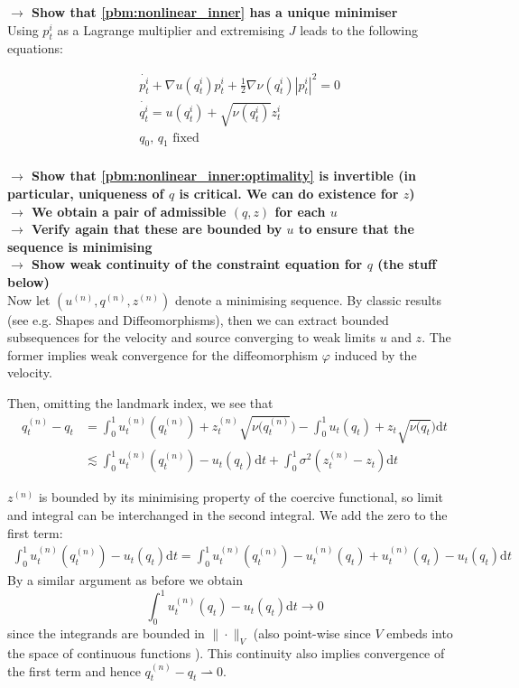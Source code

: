 \documentclass{article}
\newcommand{\half}{\frac 12}
\newcommand{\norm}[2]{\| #1 \|_{ #2 }}
\newcommand{\vnorm}[1]{\norm{ #1 }{V}}
\newcommand{\diff}[1]{\text{d} #1}
\begin{document}
\textbf{$\longrightarrow$ Show that \eqref{pbm:nonlinear_inner} has a unique minimiser}\\

Using $p_t^i$ as a Lagrange multiplier and extremising $J$ leads to the
following equations:

\begin{subequations}\label{pbm:nonlinear_inner:optimality}
\begin{align}
& \dot{p_t^i} + \nabla u(q_t^i) p_t^i + \half \nabla \nu(q_t^i) |p_t^i|^2 = 0\\
& \dot{q_t^i} = u(q_t^i) + \sqrt{\nu(q_t^i)} z^i_t\\
& q_0,\,q_1\text{ fixed}\\
\end{align}
\end{subequations}

\textbf{$\longrightarrow$ Show that \eqref{pbm:nonlinear_inner:optimality} is
invertible (in particular, uniqueness of $q$ is critical. We can do existence
for $z$)}\\
\textbf{$\longrightarrow$ We obtain a pair of admissible $(q,z)$ for each $u$}\\
\textbf{$\longrightarrow$ Verify again that these are bounded by $u$ to ensure
that the sequence is minimising}\\
\textbf{$\longrightarrow$ Show weak continuity of the constraint equation for
$q$ (the stuff below)}\\

Now let $(u^{(n)}, q^{(n)}, z^{(n)})$ denote a
minimising sequence. By classic results (see e.g.  Shapes and Diffeomorphisms),
then we can extract bounded subsequences for the velocity and source converging
to weak limits $u$ and $z$. The former implies weak
convergence for the diffeomorphism $\varphi$ induced by the velocity. 

Then, omitting the landmark index, we see that\\
\begin{align*}
q_t^{(n)} - q_t & = 
\int_0^1u_t^{(n)}(q_t^{(n)})+z_t^{(n)}\sqrt{\nu(q_t^{(n)}}) 
-\int_0^1u_t(q_t)+z_t\sqrt{\nu(q_t})  \diff{t}\\
&\lesssim \int_0^1 u_t^{(n)}(q_t^{(n)}) -  u_t(q_t)\diff{t}+ \int_0^1 \sigma^2 \left(z_t^{(n)} - z_t \right) \diff{t}
\end{align*}

$z^{(n)}$ is bounded by its minimising property of the coercive functional, so
limit and integral can be interchanged in the second integral. We add the zero
to the first term:
\begin{align*}
\int_0^1 u_t^{(n)}(q_t^{(n)}) -  u_t(q_t)\diff{t} = 
\int_0^1 u_t^{(n)}(q_t^{(n)}) - u_t^{(n)}(q_t) + u_t^{(n)}(q_t) - u_t(q_t)\diff{t}
\end{align*}
By a similar argument as before we obtain 
\[
\int_0^1 u_t^{(n)}(q_t) - u_t(q_t)\diff{t} \rightarrow 0
\]
since the integrands are bounded in $\vnorm{\cdot}$ (also point-wise since $V$
embeds into the space of continuous functions \cite{something}). This continuity
also implies convergence of the first term and hence $q_t^{(n)} -
q_t\rightharpoonup 0$.
\end{document}
